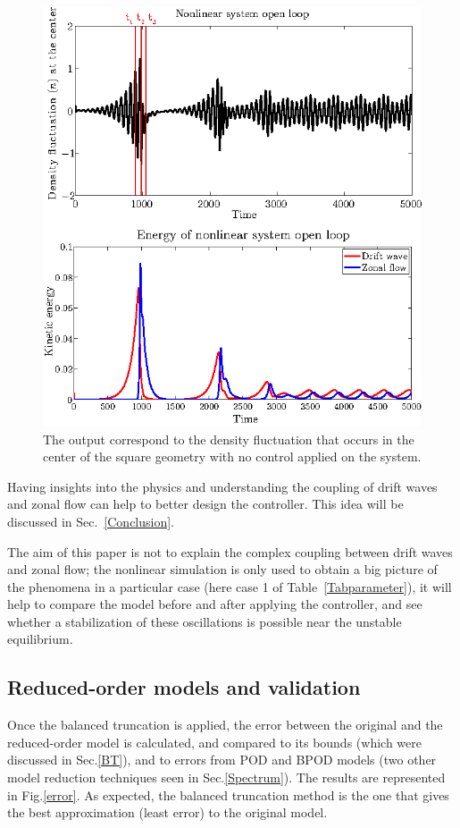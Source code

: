 \documentclass[12pt,lot, lof]{puthesis}
\begin{document}
\begin{figure}[htb]
\centering
  \includegraphics[width=0.7 \linewidth]{energy}
  \caption{The output correspond to the density fluctuation that occurs in the center of the square geometry with no control applied on the system. }
\label{output of nl}
\end{figure}


Having insights into the physics and understanding the coupling of drift waves and zonal flow can help to better design the controller. This idea will be discussed in Sec.~\ref{Conclusion}.
 
The aim of this paper is  not to explain the complex coupling between drift waves and zonal flow; the nonlinear simulation is only used to obtain a big picture of the phenomena in a particular case (here case 1 of Table~\ref{Tabparameter}), it will help to compare the model before and after applying the controller, and see whether a stabilization of these oscillations is possible near the unstable equilibrium.


\subsection{Reduced-order models and validation }
\label{ROMresults}

Once the balanced truncation is applied, the error between the original and the reduced-order model is calculated, and compared to its bounds (which were discussed in Sec.\ref{BT}), and to errors from POD and BPOD models (two other model reduction techniques seen in Sec.\ref{Spectrum}). 
The results are represented in Fig.\ref{error}.
As expected, the balanced truncation method is the one that gives the best approximation (least error) to the original model.
\end{document}
